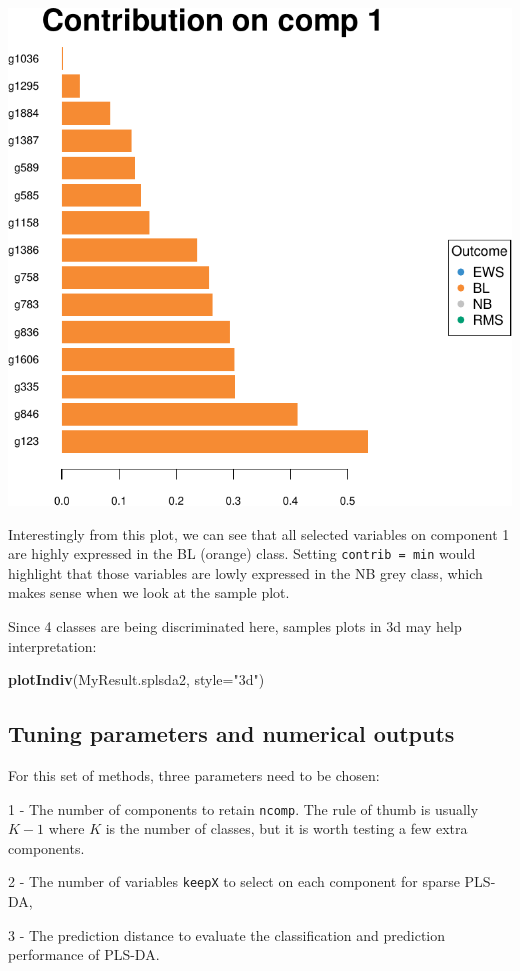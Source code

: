\documentclass[]{book}
\newenvironment{Shaded}{\begin{snugshade}}{\end{snugshade}}
\newcommand{\DataTypeTok}[1]{\textcolor[rgb]{0.13,0.29,0.53}{#1}}
\newcommand{\KeywordTok}[1]{\textcolor[rgb]{0.13,0.29,0.53}{\textbf{#1}}}
\newcommand{\NormalTok}[1]{#1}
\newcommand{\StringTok}[1]{\textcolor[rgb]{0.31,0.60,0.02}{#1}}
\begin{document}
\begin{center}\includegraphics[width=0.5\linewidth]{Figures/04-splsda-plotLoadings-1} \end{center}

Interestingly from this plot, we can see that all selected variables on component 1 are highly expressed in the BL (orange) class. Setting \texttt{contrib\ =\ \textquotesingle{}min\textquotesingle{}} would highlight that those variables are lowly expressed in the NB grey class, which makes sense when we look at the sample plot.

Since 4 classes are being discriminated here, samples plots in 3d may help interpretation:

\begin{Shaded}
\begin{Highlighting}[]
\KeywordTok{plotIndiv}\NormalTok{(MyResult.splsda2, }\DataTypeTok{style=}\StringTok{"3d"}\NormalTok{)}
\end{Highlighting}
\end{Shaded}

\hypertarget{tuning:sPLSDA}{%
\subsection{Tuning parameters and numerical outputs}\label{tuning:sPLSDA}}

For this set of methods, three parameters need to be chosen:

1 - The number of components to retain \texttt{ncomp}. The rule of thumb is usually \(K - 1\) where \(K\) is the number of classes, but it is worth testing a few extra components.

2 - The number of variables \texttt{keepX} to select on each component for sparse PLS-DA,

3 - The prediction distance to evaluate the classification and prediction performance of PLS-DA.
\end{document}
